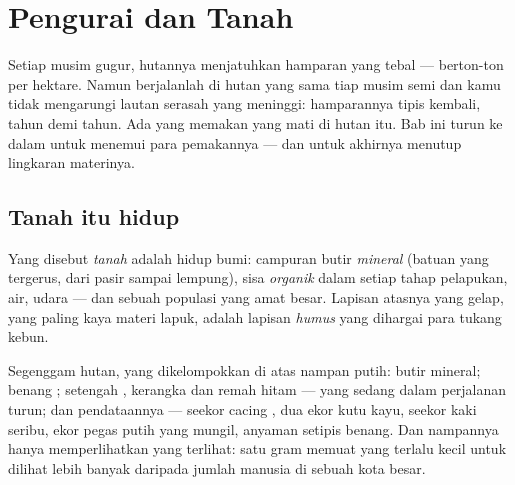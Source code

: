 \chapter{Pengurai dan Tanah}\label{ch:g6:decomposers-and-soil}

Setiap musim gugur, hutannya menjatuhkan hamparan  yang tebal ---
berton-ton per hektare. Namun berjalanlah di hutan yang sama tiap
musim semi dan kamu tidak mengarungi lautan serasah yang meninggi:
hamparannya tipis kembali, tahun demi tahun. Ada yang memakan yang
mati di hutan itu. Bab ini turun ke dalam  untuk menemui para
pemakannya --- dan untuk akhirnya menutup lingkaran materinya.

\section{Tanah itu hidup}

\begin{definition}[Tanah]\label{def:g6:decomposers-and-soil:soil}
Yang disebut \emph{tanah} adalah  hidup bumi:
campuran butir \emph{mineral} (batuan yang tergerus, dari pasir sampai
lempung), sisa \emph{organik} dalam setiap tahap pelapukan, air, udara
--- dan sebuah populasi  yang amat besar. Lapisan atasnya
yang gelap, yang paling kaya materi lapuk, adalah lapisan
\emph{humus} yang dihargai para tukang kebun.
\end{definition}

\begin{example}\label{ex:g6:decomposers-and-soil:handful}
Segenggam  hutan, yang dikelompokkan di atas nampan putih: butir
mineral; benang ; setengah , kerangka  dan remah hitam ---
 yang sedang dalam perjalanan turun; dan pendataannya
--- seekor cacing , dua ekor kutu kayu, seekor kaki seribu, ekor
pegas putih yang mungil, anyaman  setipis benang. Dan nampannya
hanya memperlihatkan yang terlihat: satu gram  memuat  yang terlalu kecil untuk dilihat lebih banyak daripada jumlah
manusia di sebuah kota besar.
\end{example}

